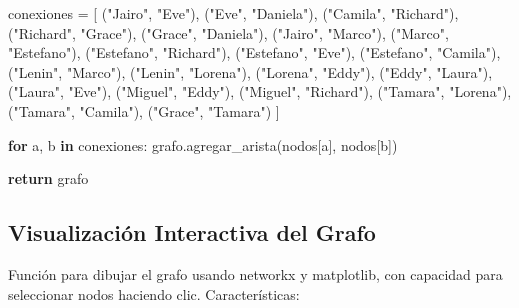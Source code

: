 \documentclass[
  spanish,
  letterpaper,
  DIV=11,
  numbers=noendperiod]{scrartcl}
\newenvironment{Shaded}{\begin{snugshade}}{\end{snugshade}}
\newcommand{\ControlFlowTok}[1]{\textcolor[rgb]{0.00,0.23,0.31}{\textbf{#1}}}
\newcommand{\KeywordTok}[1]{\textcolor[rgb]{0.00,0.23,0.31}{\textbf{#1}}}
\newcommand{\NormalTok}[1]{\textcolor[rgb]{0.00,0.23,0.31}{#1}}
\newcommand{\OperatorTok}[1]{\textcolor[rgb]{0.37,0.37,0.37}{#1}}
\newcommand{\StringTok}[1]{\textcolor[rgb]{0.13,0.47,0.30}{#1}}
\begin{document}
\begin{Shaded}
\begin{Highlighting}[]
\NormalTok{    conexiones }\OperatorTok{=}\NormalTok{ [}
\NormalTok{        (}\StringTok{"Jairo"}\NormalTok{, }\StringTok{"Eve"}\NormalTok{),}
\NormalTok{        (}\StringTok{"Eve"}\NormalTok{, }\StringTok{"Daniela"}\NormalTok{),}
\NormalTok{        (}\StringTok{"Camila"}\NormalTok{, }\StringTok{"Richard"}\NormalTok{),}
\NormalTok{        (}\StringTok{"Richard"}\NormalTok{, }\StringTok{"Grace"}\NormalTok{),}
\NormalTok{        (}\StringTok{"Grace"}\NormalTok{, }\StringTok{"Daniela"}\NormalTok{),}
\NormalTok{        (}\StringTok{"Jairo"}\NormalTok{, }\StringTok{"Marco"}\NormalTok{),}
\NormalTok{        (}\StringTok{"Marco"}\NormalTok{, }\StringTok{"Estefano"}\NormalTok{),}
\NormalTok{        (}\StringTok{"Estefano"}\NormalTok{, }\StringTok{"Richard"}\NormalTok{),}
\NormalTok{        (}\StringTok{"Estefano"}\NormalTok{, }\StringTok{"Eve"}\NormalTok{),}
\NormalTok{        (}\StringTok{"Estefano"}\NormalTok{, }\StringTok{"Camila"}\NormalTok{),}
\NormalTok{        (}\StringTok{"Lenin"}\NormalTok{, }\StringTok{"Marco"}\NormalTok{),}
\NormalTok{        (}\StringTok{"Lenin"}\NormalTok{, }\StringTok{"Lorena"}\NormalTok{),}
\NormalTok{        (}\StringTok{"Lorena"}\NormalTok{, }\StringTok{"Eddy"}\NormalTok{),}
\NormalTok{        (}\StringTok{"Eddy"}\NormalTok{, }\StringTok{"Laura"}\NormalTok{),}
\NormalTok{        (}\StringTok{"Laura"}\NormalTok{, }\StringTok{"Eve"}\NormalTok{),}
\NormalTok{        (}\StringTok{"Miguel"}\NormalTok{, }\StringTok{"Eddy"}\NormalTok{),}
\NormalTok{        (}\StringTok{"Miguel"}\NormalTok{, }\StringTok{"Richard"}\NormalTok{),}
\NormalTok{        (}\StringTok{"Tamara"}\NormalTok{, }\StringTok{"Lorena"}\NormalTok{),}
\NormalTok{        (}\StringTok{"Tamara"}\NormalTok{, }\StringTok{"Camila"}\NormalTok{),}
\NormalTok{        (}\StringTok{"Grace"}\NormalTok{, }\StringTok{"Tamara"}\NormalTok{)}
\NormalTok{    ]}

    \ControlFlowTok{for}\NormalTok{ a, b }\KeywordTok{in}\NormalTok{ conexiones:}
\NormalTok{        grafo.agregar\_arista(nodos[a], nodos[b])}

    \ControlFlowTok{return}\NormalTok{ grafo}
\end{Highlighting}
\end{Shaded}

\subsection{Visualización Interactiva del
Grafo}\label{visualizaciuxf3n-interactiva-del-grafo}

Función para dibujar el grafo usando networkx y matplotlib, con
capacidad para seleccionar nodos haciendo clic. Características:
\end{document}

